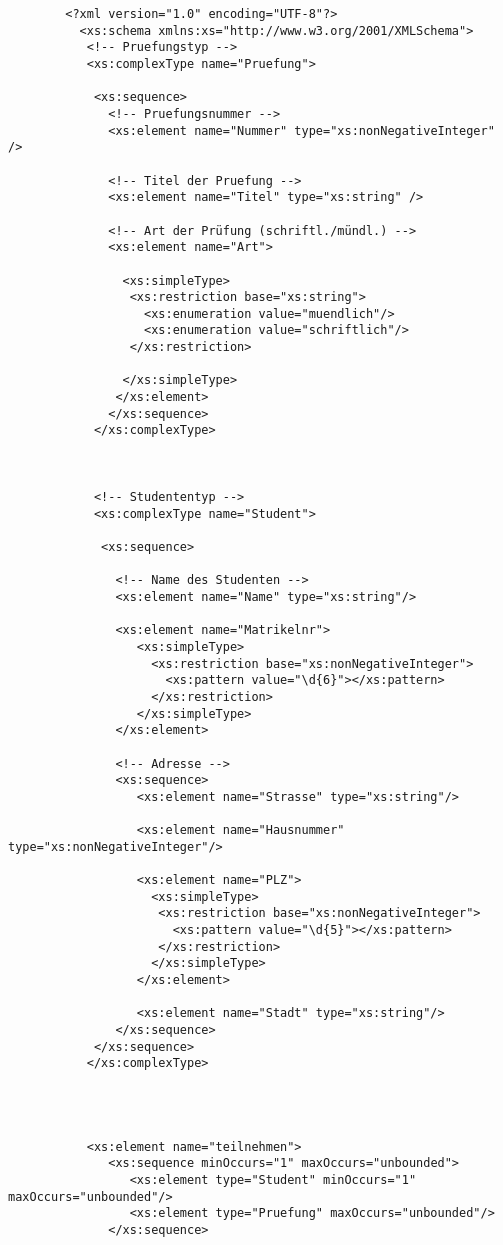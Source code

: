 
	\begin{verbatim}
		<?xml version="1.0" encoding="UTF-8"?>
		  <xs:schema xmlns:xs="http://www.w3.org/2001/XMLSchema">
		   <!-- Pruefungstyp -->
		   <xs:complexType name="Pruefung">
		
		    <xs:sequence>
		      <!-- Pruefungsnummer -->
		      <xs:element name="Nummer" type="xs:nonNegativeInteger" />
		
		      <!-- Titel der Pruefung -->
		      <xs:element name="Titel" type="xs:string" />
		
		      <!-- Art der Prüfung (schriftl./mündl.) -->
		      <xs:element name="Art">
		 
		        <xs:simpleType>
		         <xs:restriction base="xs:string">
		           <xs:enumeration value="muendlich"/>
		           <xs:enumeration value="schriftlich"/>
		         </xs:restriction>
		
		        </xs:simpleType>
		       </xs:element>
		      </xs:sequence>
		    </xs:complexType>
		
		
		
		    <!-- Studententyp -->
		    <xs:complexType name="Student">
		    
		     <xs:sequence>
		     
		       <!-- Name des Studenten -->
		       <xs:element name="Name" type="xs:string"/>
		
		       <xs:element name="Matrikelnr">
		          <xs:simpleType>
		            <xs:restriction base="xs:nonNegativeInteger">
		              <xs:pattern value="\d{6}"></xs:pattern>
		            </xs:restriction>
		          </xs:simpleType>
		       </xs:element>
		       
		       <!-- Adresse -->
		       <xs:sequence>
		          <xs:element name="Strasse" type="xs:string"/>
		       
		          <xs:element name="Hausnummer" type="xs:nonNegativeInteger"/>
		       
		          <xs:element name="PLZ">
		            <xs:simpleType>
		             <xs:restriction base="xs:nonNegativeInteger">
		               <xs:pattern value="\d{5}"></xs:pattern>
		             </xs:restriction>
		            </xs:simpleType>
		          </xs:element>
		       
		          <xs:element name="Stadt" type="xs:string"/>
		       </xs:sequence>
		    </xs:sequence>
		   </xs:complexType>
		
		
		
		
		   <xs:element name="teilnehmen">
		      <xs:sequence minOccurs="1" maxOccurs="unbounded">
		         <xs:element type="Student" minOccurs="1" maxOccurs="unbounded"/>
		         <xs:element type="Pruefung" maxOccurs="unbounded"/>
		      </xs:sequence>
		   

\end{verbatim}
